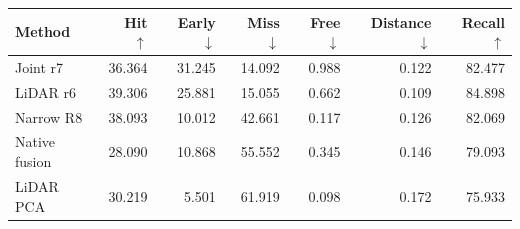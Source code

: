 \begin{tabular}{lrrrrrr}
\toprule Method & Hit $\uparrow$ & Early $\downarrow$ & Miss $\downarrow$ & Free $\downarrow$ & Distance $\downarrow$ & Recall $\uparrow$ \\
\midrule
Joint r7 & 36.364 & 31.245 & 14.092 & 0.988 & 0.122 & 82.477 \\
LiDAR r6 & 39.306 & 25.881 & 15.055 & 0.662 & 0.109 & 84.898 \\
Narrow R8 & 38.093 & 10.012 & 42.661 & 0.117 & 0.126 & 82.069 \\
Native fusion & 28.090 & 10.868 & 55.552 & 0.345 & 0.146 & 79.093 \\
LiDAR PCA & 30.219 & 5.501 & 61.919 & 0.098 & 0.172 & 75.933 \\
\bottomrule\end{tabular}
